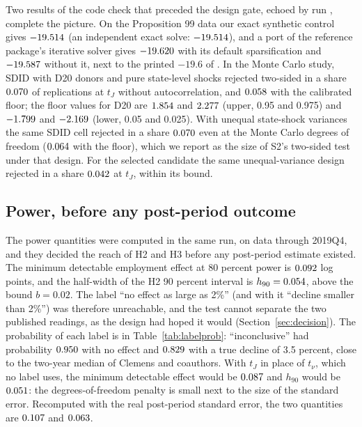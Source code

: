 Two results of the code check that preceded the design gate, echoed by run ,
complete the picture. On the Proposition 99 data our exact synthetic control gives
$-19.514$ (an independent exact solve: $-19.514$), and a port of the reference package's
iterative solver gives $-19.620$ with its default sparsification and
$-19.587$ without it, next to the printed $-19.6$ of %
\citet[Table~1]{arkhangelsky2021synthetic}. In the Monte Carlo study, SDID with D20 donors and
pure state-level shocks rejected two-sided in a share $0.070$ of
replications at $t_J$ without autocorrelation, and $0.058$ with
the calibrated floor; the floor values for D20 are $1.854$ and
$2.277$ (upper, 0.95 and 0.975) and $-1.799$ and
$-2.169$ (lower, 0.05 and 0.025). With unequal state-shock variances the same SDID
cell rejected in a share $0.070$ even at the Monte Carlo
degrees of freedom ($0.064$ with the floor), which we report
as the size of S2's two-sided test under that design. For the selected candidate the same
unequal-variance design rejected in a share $0.042$ at
$t_J$, within its bound.

\subsection{Power, before any post-period outcome}
\label{sec:res-power}

The power quantities were computed in the same run, on data through 2019Q4, and they decided the
reach of H2 and H3 before any post-period estimate existed. The minimum detectable employment
effect at 80 percent power is $0.092$ log points, and the half-width of the H2 90 percent
interval is $h_{90} = 0.054$, above the bound $b = 0.02$. The label ``no effect as large as
2\%'' (and with it ``decline smaller than 2\%'') was therefore unreachable, and the test cannot
separate the two published readings, as the design had hoped it would
(Section~\ref{sec:decision}). The probability of each label is in Table~\ref{tab:labelprob}:
``inconclusive'' had probability $0.950$ with no effect and $0.829$
with a true decline of 3.5 percent, close to the two-year median of Clemens and coauthors. With
$t_J$ in place of $t_\nu$, which no label uses, the minimum detectable effect would be
$0.087$ and $h_{90}$ would be $0.051$: the degrees-of-freedom penalty is small
next to the size of the standard error. Recomputed with the real post-period standard error, the
two quantities are $0.107$ and $0.063$.

